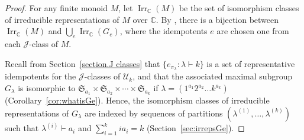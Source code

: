 \documentclass[ALCO,Unicode]{cedram}
\newcommand{\CC}{\mathbb C}
\begin{document}
\begin{proof}
    For any finite monoid $M$, let $\operatorname{Irr}_\mathbb{C}(M)$ be
    the set of isomorphism classes of irreducible representations of $M$ over $\CC$.
    By \cite[Corollary 5.6]{Steinberg.2016}, there is a bijection between
    $\operatorname{Irr}_\mathbb{C}(M)$
    and
    $\bigcup_{e} \operatorname{Irr}_\mathbb{C}(G_e)$,
    where the idempotents $e$ are chosen one from each $\mathscr{J}$-class of $M$.

    Recall from Section~\ref{section.J classes} that
    $\{e_{\pi_\lambda} : \lambda \vdash k\}$ is a set of representative
    idempotents for the $\mathscr{J}$-classes of $\mathcal{U}_k$,
    and that the associated maximal subgroup $G_\lambda$ is isomorphic to
    $\mathfrak{S}_{a_1} \times \mathfrak{S}_{a_2} \times \cdots \times \mathfrak{S}_{a_k}$
    if $\lambda = (1^{a_1}2^{a_2} \ldots k^{a_k})$ (Corollary~\ref{cor:whatisGe}).
    Hence, the isomorphism classes of irreducible representations of
    $G_\lambda$ are indexed by sequences of partitions $(\lambda^{(1)},
    \ldots, \lambda^{(k)})$ such that $\lambda^{(i)}\vdash a_i$
    and $\sum_{i=1}^k ia_i = k$ (\cf Section~\ref{sec:irrepsGe}).
\end{proof}
\end{document}
